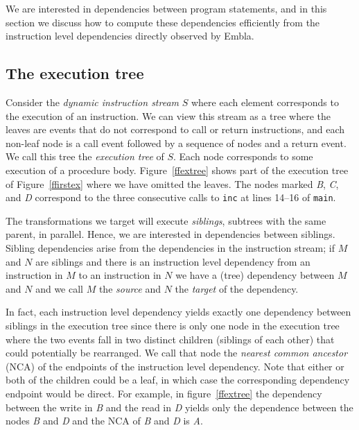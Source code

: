 \documentclass{acm_proc_article-sp}
\begin{document}
We are interested in dependencies between program statements, and in 
this section we discuss how to compute these dependencies efficiently from
the instruction level dependencies directly observed by Embla.

\subsection{The execution tree}

Consider the {\em dynamic instruction stream} $S$ where each element 
corresponds to the execution
of an instruction. We can view this stream as a tree where the leaves are 
events that do not correspond to call or return instructions, and each 
non-leaf node is a call
event followed by a sequence of nodes and a return event. We call
this tree the {\em execution tree} of $S$. 
Each node corresponds to some execution of a procedure body.
Figure~\ref{ffextree} shows part of
the execution tree of Figure~\ref{ffirstex} where we have omitted the 
leaves. The nodes marked {\it B}, {\it C}, and {\it D} correspond to 
the three consecutive calls to {\tt inc} at lines 14--16 of {\tt main}.

The transformations we target will execute {\em siblings}, subtrees with
the same parent, in parallel.  Hence, we 
are interested in dependencies between siblings.  Sibling dependencies
arise from the 
dependencies in the instruction stream; if $M$ and $N$ are siblings and
there is an instruction level dependency from an instruction in $M$ 
to an instruction in $N$ we have a (tree) dependency between $M$ and $N$
and we call $M$ the {\em source} and $N$ the {\em target} of the dependency.

In fact, each instruction level dependency yields exactly one dependency
between siblings in the execution tree since there is only one node
in the execution tree  
where the two events fall in two distinct children (siblings of each other)
that could potentially be rearranged. We call that node the {\em nearest
common ancestor} (NCA) of the endpoints of the instruction level dependency.
Note that either or both of the children could be a leaf, in which case the
corresponding dependency endpoint would be direct.
For example, in figure~\ref{ffextree}
the dependency between the write in {\it B} and the read in {\it D} yields
only the dependence between the nodes {\it B} and {\it D} and the NCA of
{\it B} and {\it D} is {\it A}. 
\end{document}

